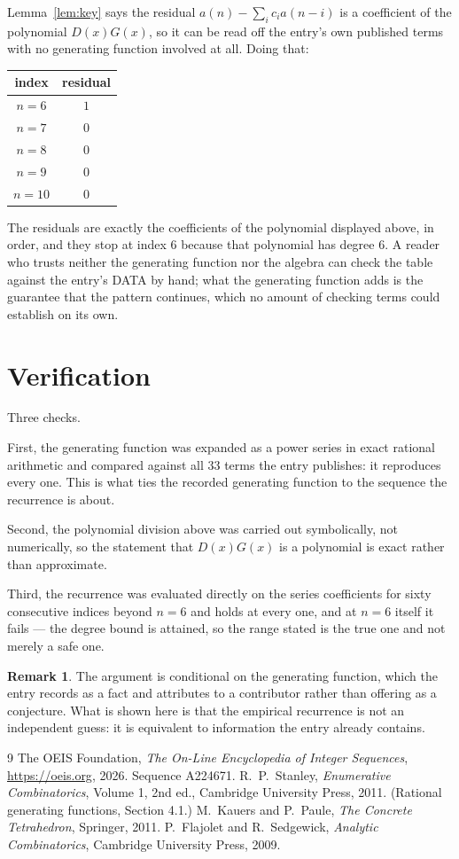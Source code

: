 \documentclass[11pt,a4paper]{article}
\theoremstyle{plain}
\theoremstyle{definition}
\newtheorem{remark}[theorem]{Remark}
\begin{document}
Lemma~\ref{lem:key} says the residual $a(n)-\sum_ic_ia(n-i)$ is a coefficient of the
polynomial $D(x)G(x)$, so it can be read off the entry's own published terms with no
generating function involved at all. Doing that:
\begin{center}
\begin{tabular}{cc}
index & residual \\ \hline
$n=6$ & $1$ \\
$n=7$ & $0$ \\
$n=8$ & $0$ \\
$n=9$ & $0$ \\
$n=10$ & $0$
\end{tabular}
\end{center}
The residuals are exactly the coefficients of the polynomial displayed above, in order, and
they stop at index $6$ because that polynomial has degree $6$. A reader who trusts
neither the generating function nor the algebra can check the table against the entry's DATA
by hand; what the generating function adds is the guarantee that the pattern continues, which
no amount of checking terms could establish on its own.

\section{Verification}

Three checks.

First, the generating function was expanded as a power series in exact rational arithmetic and
compared against all $33$ terms the entry publishes: it reproduces every one. This is
what ties the recorded generating function to the sequence the recurrence is about.

Second, the polynomial division above was carried out symbolically, not numerically, so the
statement that $D(x)G(x)$ is a polynomial is exact rather than approximate.

Third, the recurrence was evaluated directly on the series coefficients for sixty consecutive
indices beyond $n=6$ and holds at every one, and at $n=6$ itself it fails --- the
degree bound is attained, so the range stated is the true one and not merely a safe one.

\begin{remark}
The argument is conditional on the generating function, which the entry records as a fact and
attributes to a contributor rather than offering as a conjecture. What is shown here is that
the empirical recurrence is not an independent guess: it is equivalent to information the
entry already contains.
\end{remark}

\begin{thebibliography}{9}
 The OEIS Foundation, \emph{The On-Line Encyclopedia of Integer
Sequences}, \url{https://oeis.org}, 2026. Sequence A224671.
 R.~P.~Stanley, \emph{Enumerative Combinatorics}, Volume 1, 2nd ed.,
Cambridge University Press, 2011. (Rational generating functions, Section 4.1.)
 M.~Kauers and P.~Paule, \emph{The Concrete Tetrahedron}, Springer, 2011.
 P.~Flajolet and R.~Sedgewick, \emph{Analytic Combinatorics}, Cambridge
University Press, 2009.
\end{thebibliography}
\end{document}
